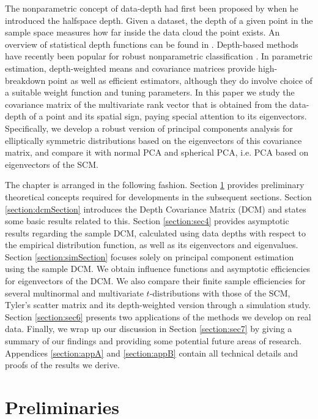 \documentclass[fleqn,11pt]{article}
\begin{document}
The nonparametric concept of data-depth had first been proposed by \cite{tukey75} when he introduced the halfspace depth. Given a dataset, the depth of a given point in the sample space measures how far inside the data cloud the point exists. An overview of statistical depth functions can be found in \citep{zuo00}. Depth-based methods have recently been popular for robust nonparametric classification \citep{jornsten04, ghosh05, dutta12, sguera14}. In parametric estimation, depth-weighted means \citep{ZuoCuiHe04} and covariance matrices \citep{ZuoCui05} provide high-breakdown point as well as efficient estimators, although they do involve choice of a suitable weight function and tuning parameters. In this paper we study the covariance matrix of the multivariate rank vector that is obtained from the data-depth of a point and its spatial sign, paying special attention to its eigenvectors. Specifically, we develop a robust version of principal components analysis for elliptically symmetric distributions based on the eigenvectors of this covariance matrix, and compare it with normal PCA and spherical PCA, i.e. PCA based on eigenvectors of the SCM.

The chapter is arranged in the following fashion. Section \ref{section:sec2} provides preliminary theoretical concepts required for developments in the subsequent sections. Section \ref{section:dcmSection} introduces the Depth Covariance Matrix (DCM) and states some basic results related to this. Section \ref{section:sec4} provides asymptotic results regarding the sample DCM, calculated using data depths with respect to the empirical distribution function, as well as its eigenvectors and eigenvalues. Section \ref{section:simSection} focuses solely on principal component estimation using the sample DCM. We obtain influence functions and asymptotic efficiencies for eigenvectors of the DCM. We also compare their finite sample efficiencies for several multinormal and multivariate $t$-distributions with those of the SCM, Tyler's scatter matrix and its depth-weighted version through a simulation study. Section \ref{section:sec6} presents two applications of the methods we develop on real data. Finally, we wrap up our discussion in Section \ref{section:sec7} by giving a summary of our findings and providing some potential future areas of research. Appendices \ref{section:appA} and \ref{section:appB} contain all technical details and proofs of the results we derive.

\section{Preliminaries}\label{section:sec2}
\end{document}
